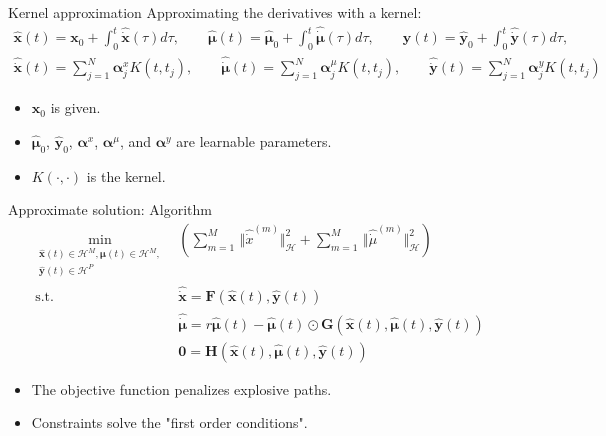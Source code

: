 \documentclass[aspectratio=169,10pt]{beamer}
\begin{document}
\begin{frame}{Kernel approximation}
Approximating the derivatives with a kernel:
	\begin{align*}
		\hat{\boldsymbol{x}}(t) = \boldsymbol{x}_0 + \int_0^t \hat{\dot{\boldsymbol{x}}}(\tau) d\tau, \qquad
		\hat{\boldsymbol{\mu}}(t) = \hat{\boldsymbol{\mu}}_0 + \int_0^t \hat{\dot{\boldsymbol{\mu}}}(\tau) d\tau, \qquad
		\hat{\boldsymbol{y}}(t) = \hat{\boldsymbol{y}}_0 + \int_0^t \hat{\dot{\boldsymbol{y}}}(\tau) d\tau,\\
		\hat{\dot{\boldsymbol{x}}}(t)  = \sum_{j=1}^N \boldsymbol{\alpha}^x_j K(t, t_j), \qquad
		\hat{\dot{\boldsymbol{\mu}}}(t)  = \sum_{j=1}^N \boldsymbol{\alpha}^\mu_j K(t, t_j), \qquad
		\hat{\dot{\boldsymbol{y}}}(t)  = \sum_{j=1}^N \boldsymbol{\alpha}^y_j K(t, t_j)
	\end{align*}
\begin{itemize}
	\item $\boldsymbol{x}_0$ is given.
	\item $\hat{\boldsymbol{\mu}}_0$, $\hat{\boldsymbol{y}}_0$, $\boldsymbol{\alpha}^x$,
	$\boldsymbol{\alpha}^\mu$, and $\boldsymbol{\alpha}^y$ are learnable parameters.
	\item $K(\cdot,\cdot)$ is the kernel.
\end{itemize}
\end{frame}

\begin{frame}{Approximate solution: Algorithm}
	\begin{align*}
		\min_{\substack{
			\hat{\boldsymbol{x}}(t)	\in \mathcal{H}^{M}, \hat{\boldsymbol{\mu}}(t) \in \mathcal{H}^{M}, \\\hat{\boldsymbol{y}}(t) \in \mathcal{H}^{P} 
		}}\, & \left(
	\sum_{m=1}^{M}\,  \Vert \hat{\dot{x}}^{(m)}  \Vert^2_{\mathcal{H}}  + \sum_{m=1}^{M}\, \Vert \hat{\dot{\mu}}^{(m)}  \Vert^2_{\mathcal{H}}  \right) \\
	\text{s.t.}\, &\hat{\dot{\boldsymbol{x}}} = \boldsymbol{F}\left(\hat{\boldsymbol{x}}(t),\hat{\boldsymbol{y}}(t)\right)\\
	&\hat{\dot{\boldsymbol{\mu}}} = r\hat{\boldsymbol{\mu}}(t)-\hat{\boldsymbol{\mu}}(t)\odot \boldsymbol{G}\left(\hat{\boldsymbol{x}}(t),\hat{\boldsymbol{\mu}}(t),\hat{\boldsymbol{y}}(t)\right)\\
	&\boldsymbol{0}= \boldsymbol{H}\left(\hat{\boldsymbol{x}}(t),\hat{\boldsymbol{\mu}}(t),\hat{\boldsymbol{y}}(t)\right)
	\end{align*}

\begin{itemize}
	\item The objective function penalizes explosive paths.
	\item Constraints solve the "first order conditions".
\end{itemize}	
	
\end{frame}
\end{document}
